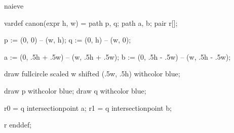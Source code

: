 %
%
%


\startenvironment naieve

	\startMPdefinitions
		vardef canon(expr h, w) =
			path p, q;
			path a, b;
			pair r[];

			p := (0, 0) -- (w, h);
			q := (0, h) -- (w, 0);

			a := (0, .5h + .5w) -- (w, .5h + .5w); %
			b := (0, .5h - .5w) -- (w, .5h - .5w); %

			draw fullcircle scaled w shifted (.5w, .5h) withcolor blue;

			draw p withcolor blue;
			draw q withcolor blue;

			r0 = q intersectionpoint a; %
			r1 = q intersectionpoint b; %

			r
		enddef;
	\stopMPdefinitions

\stopenvironment


